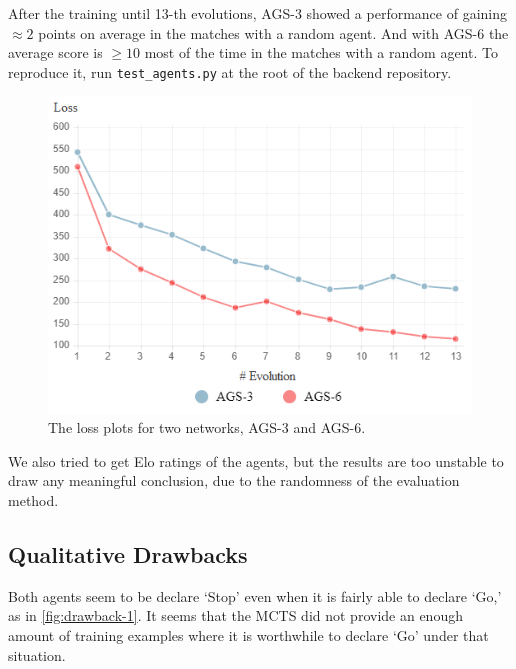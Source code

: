 \documentclass[10pt,twocolumn,letterpaper]{article}
\begin{document}
After the training until 13-th evolutions, AGS-3 showed a performance of gaining $\approx 2$ points on average in the matches with a random agent. And with AGS-6 the average score is $\ge 10$ most of the time in the matches with a random agent. To reproduce it, run \texttt{test\_agents.py} at the root of the backend repository.

\begin{figure}
   \centering
   \includegraphics[width=0.8\linewidth]{loss}
   \caption{The loss plots for two networks, AGS-3 and AGS-6.}
   \label{fig:loss-plots}
\end{figure}

We also tried to get Elo ratings of the agents, but the results are too unstable to draw any meaningful conclusion, due to the randomness of the evaluation method.

\subsection{Qualitative Drawbacks}

Both agents seem to be declare `Stop' even when it is fairly able to declare `Go,' as in \cref{fig:drawback-1}. It seems that the MCTS did not provide an enough amount of training examples where it is worthwhile to declare `Go' under that situation.
\end{document}
